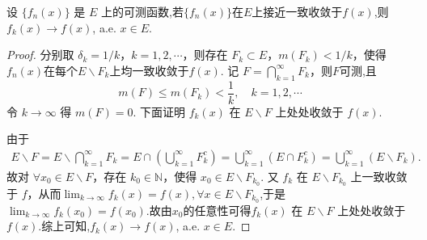 \documentclass[../../main.tex]{subfiles}
\begin{document}
\begin{theorem}\label{theorem:Egorov定理的逆定理}
设 $\{f_n(x)\}$ 是 $E$ 上的可测函数,若$\{f_n(x)\}$在$E$上接近一致收敛于$f(x)$,则$f_k(x)\to f(x)$, a.e. $x\in E$.
\end{theorem}
\begin{proof}
分别取 $\delta_k = 1/k$，$k = 1,2,\cdots$，则存在 $F_k\subset E$，$m(F_k)<1/k$，使得$f_n(x)$在每个$E\backslash F_k$上均一致收敛于$f(x)$.
记 $F = \bigcap_{k = 1}^{\infty}F_k$，则$F$可测,且
\[
m(F)\leqslant m(F_k)<\frac{1}{k},\quad k = 1,2,\cdots
\]
令 $k\to\infty$ 得 $m(F) = 0$. 下面证明 $f_k(x)$ 在 $E\backslash F$ 上处处收敛于 $f(x)$.

由于
\begin{align*}
E\backslash F=E\backslash \bigcap_{k = 1}^{\infty}F_k=E\cap\left(\bigcup_{k = 1}^{\infty}F_k^c\right)
=\bigcup_{k = 1}^{\infty}(E\cap F_k^c)=\bigcup_{k = 1}^{\infty}(E\backslash F_k).
\end{align*}
故对 $\forall x_0\in E\backslash F$，存在 $k_0\in\mathbb{N}$，使得 $x_0\in E\backslash F_{k_0}$. 又 $f_k$ 在 $E\backslash F_{k_0}$ 上一致收敛于 $f$，从而$\lim_{k\to \infty}f_k(x)=f(x),\forall x\in E\backslash F_{k_0}$,于是$\lim_{k\to \infty}f_k(x_0)=f(x_0)$.故由$x_0$的任意性可得$f_k(x)$ 在 $E\backslash F$ 上处处收敛于 $f(x)$.综上可知,$f_k(x)\to f(x)$, a.e. $x\in E$.

\end{proof}
\end{document}
